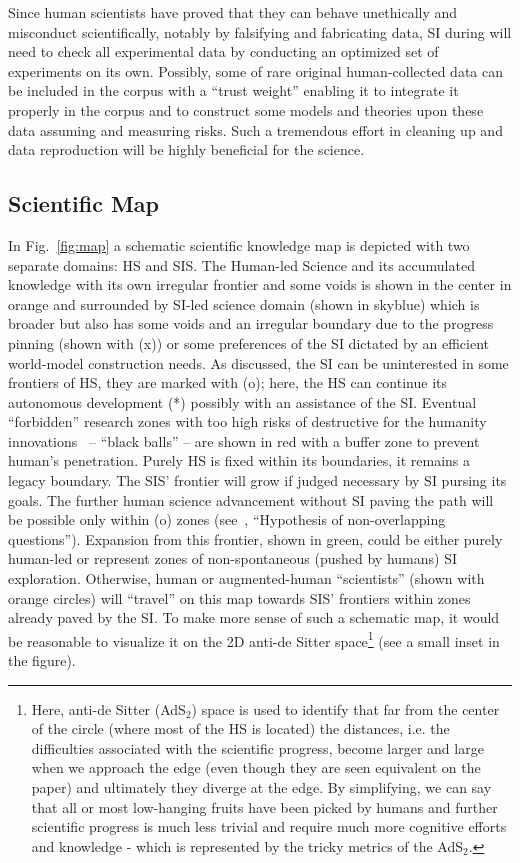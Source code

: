 \documentclass[a4paper,11pt]{article}
\begin{document}
Since human scientists have proved that they can behave unethically and misconduct scientifically, notably by falsifying and fabricating data, SI during will need to check all experimental data by conducting an optimized set of experiments on its own. Possibly, some of rare original human-collected data can be included in the corpus with a ``trust weight'' enabling it to integrate it properly in the corpus and to construct some models and theories upon these data assuming and measuring risks. Such a tremendous effort in cleaning up and data reproduction will be highly beneficial for the science.

\subsection{Scientific Map}

In Fig.~\ref{fig:map} a schematic scientific knowledge map is depicted with two separate domains: HS and SIS. The Human-led Science and its accumulated knowledge with its own irregular frontier and some voids is shown in the center in orange and surrounded by SI-led science domain (shown in skyblue) which is broader but also has some voids and an irregular boundary due to the progress pinning (shown with (x)) or some preferences of the SI dictated by an efficient world-model construction needs. As discussed, the SI can be uninterested in some frontiers of HS, they are marked with (o); here, the HS can continue its autonomous development (*) possibly with an assistance of the SI. Eventual ``forbidden'' research zones with too high risks of destructive for the humanity innovations~\cite{VulnerableWorldHypothesis} -- ``black balls'' -- are shown in red with a buffer zone to prevent human's penetration. Purely HS is fixed within its boundaries, it remains a legacy boundary. The SIS' frontier will grow if judged necessary by SI pursing its goals. The further human science advancement without SI paving the path will be possible only within (o) zones (see~, ``Hypothesis of non-overlapping questions''). 
Expansion from this frontier, shown in green, could be either purely human-led or represent zones of non-spontaneous (pushed by humans) SI exploration. Otherwise, human or augmented-human ``scientists'' (shown with orange circles) will ``travel'' on this map towards SIS' frontiers within zones already paved by the SI. To make more sense of such a schematic map, it would be reasonable to visualize it on the 2D anti-de Sitter space\footnote{Here, anti-de Sitter (AdS$_2$) space is used to identify that far from the center of the circle (where most of the HS is located) the distances, i.e. the difficulties associated with the scientific progress, become larger and large when we approach the edge (even though they are seen equivalent on the paper) and ultimately they diverge at the edge. By simplifying, we can say that all or most low-hanging fruits have been picked by humans and further scientific progress is much less trivial and require much more cognitive efforts and knowledge - which is represented by the tricky metrics of the AdS$_2$.} (see a small inset in the figure).
\end{document}
